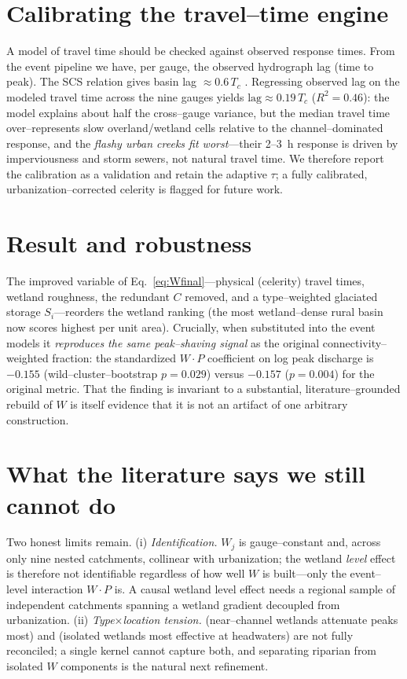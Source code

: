 \documentclass[11pt]{article}
\newcommand{\Wj}{W_{j}}
\begin{document}
\section{Calibrating the travel--time engine}\label{sec:calib}
A model of travel time should be checked against observed response times. From the event pipeline
we have, per gauge, the observed hydrograph lag (time to peak). The SCS relation gives basin
lag $\approx0.6\,T_c$ \citep{tr55}. Regressing observed lag on the modeled travel time across the
nine gauges yields $\text{lag}\approx0.19\,T_c$ ($R^2=0.46$): the model explains about half the
cross--gauge variance, but the median travel time over--represents slow overland/wetland cells
relative to the channel--dominated response, and the \emph{flashy urban creeks fit worst}---their
2--3~h response is driven by imperviousness and storm sewers, not natural travel time. We therefore
report the calibration as a validation and retain the adaptive $\tau$; a fully calibrated,
urbanization--corrected celerity is flagged for future work.

\section{Result and robustness}
The improved variable of Eq.~\eqref{eq:Wfinal}---physical (celerity) travel times, wetland
roughness, the redundant $C$ removed, and a type--weighted glaciated storage $S_i$---reorders the
wetland ranking (the most wetland--dense rural basin now scores highest per unit area). Crucially,
when substituted into the event models it \emph{reproduces the same peak--shaving signal} as the
original connectivity--weighted fraction: the standardized $W\!\cdot\!P$ coefficient on log peak
discharge is $-0.155$ (wild--cluster--bootstrap $p=0.029$) versus $-0.157$ ($p=0.004$) for the
original metric. That the finding is invariant to a substantial, literature--grounded rebuild of
$W$ is itself evidence that it is not an artifact of one arbitrary construction.

\section{What the literature says we still cannot do}
Two honest limits remain. (i) \emph{Identification.} $\Wj$ is gauge--constant and, across only
nine nested catchments, collinear with urbanization; the wetland \emph{level} effect is therefore
not identifiable regardless of how well $W$ is built---only the event--level interaction
$W\!\cdot\!P$ is. A causal wetland level effect needs a regional sample of independent catchments
spanning a wetland gradient decoupled from urbanization. (ii) \emph{Type$\times$location tension.}
\citet{ameli2019} (near--channel wetlands attenuate peaks most) and \citet{fossey2016} (isolated
wetlands most effective at headwaters) are not fully reconciled; a single kernel cannot capture
both, and separating riparian from isolated $W$ components is the natural next refinement.
\end{document}
